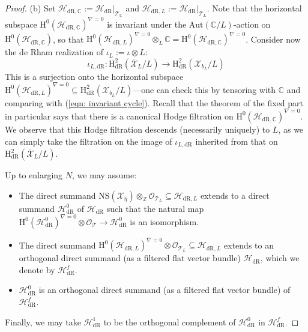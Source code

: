 \documentclass[letter, 11pt]{article}
\theoremstyle{plain}
\theoremstyle{definition}
\newcommand{\IC}{\mathbb{C}}
\newcommand{\IZ}{\mathbb{Z}}
\newcommand{\Aut}{\mathrm{Aut}}
\newcommand\tensor{{\otimes}}
\newcommand{\<}{\langle}
\renewcommand{\>}{\rangle}
\newcommand{\fp}{\mathfrak{p}}
\newcommand{\sH}{\mathcal{H}}
\newcommand{\sX}{\mathcal{X}}
\newcommand{\sT}{\mathcal{T}}
\newcommand{\sO}{\mathcal{O}}
\renewcommand{\H}{\mathrm{H}}
\newcommand{\dR}{\mathrm{dR}}
\newcommand{\cris}{\mathrm{cris}}
\newcommand{\NS}{\mathrm{NS}}
\begin{document}
\begin{proof}
    (b) Set $\sH_{\dR, \IC} := \sH_\dR |_{\sT_\IC}$ and $\sH_{\dR, L} := \sH_\dR |_{\sT_L}$. Note that the horizontal subspace $\H^0(\sH_{\dR, \IC})^{\nabla = 0}$ is invariant under the $\Aut(\IC / L)$-action on $\H^0(\sH_{\dR, \IC})$, so that $\H^0(\sH_{\dR, L})^{\nabla = 0} \tensor_L \IC = \H^0(\sH_{\dR, \IC})^{\nabla = 0}$. Consider now the de Rham realization of $\iota_L := \iota \tensor L$: 
    $$ \iota_{L, \dR} : \H^2_\dR(\overline{\sX}_L/L) \to \H^2_\dR(\sX_{b_L}/L) $$
    This is a surjection onto the horizontal subspace $\H^0(\sH_{\dR, L})^{\nabla = 0} \subseteq \H^2_\dR(\sX_{b_L}/L)$---one can check this by tensoring with $\IC$ and comparing with (\ref{eqn: invariant cycle}). Recall that the theorem of the fixed part in particular says that there is a canonical Hodge filtration on $\H^0(\sH_{\dR, \IC})^{\nabla = 0}$. We observe that this Hodge filtration descends (necessarily uniquely) to $L$, as we can simply take the filtration on the image of $\iota_{L, \dR}$ inherited from that on $\H^2_\dR(\overline{\sX}_L/L)$. 
    
    Up to enlarging $N$, we may assume: 
    \begin{itemize}
        \item The direct summand $\NS(\sX_\eta) \tensor_\IZ \sO_{\sT_L} \subseteq \sH_{\dR, L}$ extends to a direct summand $\sH^0_\dR$ of $\sH_\dR$ such that the natural map $\H^0(\sH^0_\dR)^{\nabla = 0} \tensor \sO_{\sT} \to \sH^0_\dR$ is an isomorphism. 
        \item The direct summand $\H^0(\sH_{\dR, L})^{\nabla = 0} \tensor \sO_{\sT_L} \subseteq \sH_{\dR, L}$ extends to an orthogonal direct summand (as a filtered flat vector bundle) $\sH_\dR$, which we denote by $\sH^f_\dR$. 
        \item $\sH^0_\dR$ is an orthogonal direct summand  (as a filtered flat vector bundle) of $\sH^f_\dR$. 
    \end{itemize}
    Finally, we may take $\sH_\dR^1$ to be the orthogonal complement of $\sH^0_\dR$ in $\sH^f_\dR$. 



\end{proof}
\end{document}
